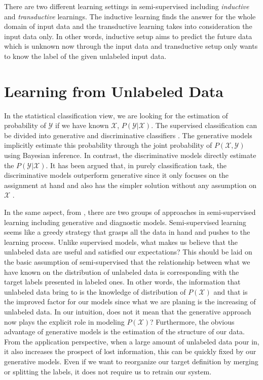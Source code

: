 There are two different learning settings in semi-supervised including \textit{inductive} and \textit{transductive} learnings. The inductive learning finds the answer for the whole domain of input data and the transductive learning takes into consideration the input data only. In other words, inductive setup aims to predict the future data which is unknown now through the input data and transductive setup only wants to know the label of the given unlabeled input data.

\section{Learning from Unlabeled Data}

In the statistical classification view, we are looking for the estimation of probability of $\mathcal{Y}$ if we have known $\mathcal{X}$, $P(\mathcal{Y} | \mathcal{X})$. The supervised classification can be divided into generative and discriminative classifiers \parencite{NIPS2001_2020}. The generative models implicitly estimate this probability through the joint probability of $P(\mathcal{X}, \mathcal{Y})$ using Bayesian inference. In contrast, the discriminative models directly estimate the $P(\mathcal{Y} | \mathcal{X})$. It has been argued that, in purely classification task, the discriminative models outperform generative since it only focuses on the assignment at hand and also has the simpler solution without any assumption on $\mathcal{X}$ \parencite{Vapnik1998a}. 

In the same aspect, from \parencite{Olivier2006}, there are two groups of approaches in semi-supervised learning including generative and diagnostic models. Semi-supervised learning seems like a greedy strategy that grasps all the data in hand and pushes to the learning process. Unlike supervised models, what makes us believe that the unlabeled data are useful and satisfied our expectations? This should be laid on the basic assumption of semi-supervised that the relationship between what we have known on the distribution of unlabeled data is corresponding with the target labels presented in labeled ones. In other words, the information that unlabeled data bring to is the knowledge of distribution of $P(\mathcal{X})$ and that is the improved factor for our models since what we are planing is the increasing of unlabeled data. In our intuition, does not it mean that the generative approach now plays the explicit role in modeling $P(\mathcal{X})$? Furthermore, the obvious advantage of generative models is the estimation of the structure of our data. From the application perspective, when a large amount of unlabeled data pour in, it also increases the prospect of lost information, this can be quickly fixed by our generative models. Even if we want to reorganize our target definition by merging or splitting the labels, it does not require us to retrain our system.

